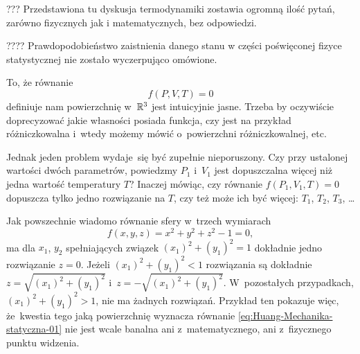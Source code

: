 \documentclass[a4paper,11pt]{article}
\begin{document}
\vspace{\spaceFour}





\noindent
??? Przedstawiona tu dyskusja termodynamiki zostawia ogromną ilość pytań,
zarówno fizycznych jak i matematycznych, bez odpowiedzi.

\vspace{\spaceFour}





\noindent
???? Prawdopodobieństwo zaistnienia danego stanu w części poświęconej fizyce
statystycznej nie zostało wyczerpująco omówione.







\noindent
{} To, że równanie
\begin{equation}
  \label{eq:Huang-Mechanika-statystyczna-01}
  f( P, V, T ) = 0
\end{equation}
definiuje nam powierzchnię w~$\mathbb{R}^{ 3 }$ jest intuicyjnie jasne. Trzeba by
oczywiście doprecyzować jakie własności posiada funkcja, czy jest na
przykład różniczkowalna i~wtedy możemy mówić o~powierzchni różniczkowalnej,
etc.

Jednak jeden problem wydaje~się być zupełnie nieporuszony. Czy przy
ustalonej wartości dwóch parametrów, powiedzmy $P_{ 1 }$ i~$V_{ 1 }$ jest
dopuszczalna więcej niż jedna wartość temperatury $T$? Inaczej mówiąc, czy
równanie $f( P_{ 1 }, V_{ 1 }, T ) = 0$ dopuszcza tylko jedno rozwiązanie na
$T$, czy też może ich być więcej: $T_{ 1 }$, $T_{ 2 }$, $T_{ 3 }$, \ldots

Jak powszechnie wiadomo równanie sfery w~trzech wymiarach
\begin{equation}
  \label{eq:Huang-Mechanika-statyczna-02}
  f( x, y, z ) = x^{ 2 } + y^{ 2 } + z^{ 2 } - 1 = 0,
\end{equation}
ma dla $x_{ 1 }$, $y_{ 2 }$ spełniających związek
$( x_{ 1 } )^{ 2 } + ( y_{ 1 } )^{ 2 } = 1$ dokładnie jedno rozwiązanie
$z = 0$. Jeżeli $( x_{ 1 } )^{ 2 } + ( y_{ 1 } )^{ 2 } < 1$ rozwiązania są
dokładnie $z = \sqrt{ ( x_{ 1 } )^{ 2 } + ( y_{ 1 } )^{ 2 } }$
i~$z = -\sqrt{ ( x_{ 1 } )^{ 2 } + ( y_{ 1 } )^{ 2 } }$. W~pozostałych
przypadkach, $( x_{ 1 } )^{ 2 } + ( y_{ 1 } )^{ 2 } > 1$, nie ma żadnych
rozwiązań. Przykład ten pokazuje więc, że~kwestia tego jaką powierzchnię
wyznacza równanie \eqref{eq:Huang-Mechanika-statyczna-01} nie jest wcale
banalna ani z~matematycznego, ani z~fizycznego punktu widzenia.
\end{document}

